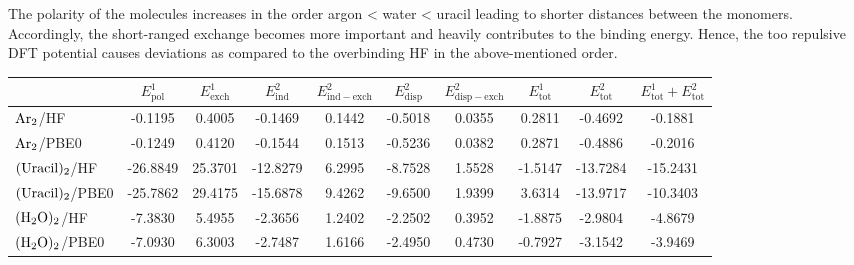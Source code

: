 \documentclass[a4paper,12pt]{scrartcl}
\newcommand{\m}[1]{\mathrm{#1}}
\begin{document}
The polarity of the molecules increases in the order argon < water < uracil leading to shorter distances between the monomers. Accordingly, the short-ranged exchange becomes more important and heavily contributes to the binding energy. Hence, the too repulsive DFT potential causes deviations as compared to the overbinding HF in the above-mentioned order.
%
\begin{table}
	\centering
	\label{tab:noncov}
	\begin{adjustbox}{width=\columnwidth,center}
		\begin{tabular}{l|ccccccccc}
			\toprule
			                        & $ E^1_\m{pol} $ & $ E^1_\m{exch} $ & $ E^2_\m{ind} $ & $ E^2_\m{ind-exch} $ & $ E^2_\m{disp} $ & $ E^2_\m{disp-exch} $ & $ E^1_\m{tot} $ & $ E^2_\m{tot} $ & $ E^1_\m{tot} + E^2_\m{tot} $ \\
			\midrule
			$ \ce{Ar2} $/HF         & -0.1195         & 0.4005           & -0.1469         & 0.1442               & -0.5018          & 0.0355                & 0.2811          & -0.4692         & -0.1881                       \\
			$ \ce{Ar2} $/PBE0       & -0.1249         & 0.4120           & -0.1544         & 0.1513               & -0.5236          & 0.0382                & 0.2871          & -0.4886         & -0.2016                       \\
			$ \ce{(Uracil)2} $/HF   & -26.8849        & 25.3701          & -12.8279        & 6.2995               & -8.7528          & 1.5528                & -1.5147         & -13.7284        & -15.2431                      \\
			$ \ce{(Uracil)2} $/PBE0 & -25.7862        & 29.4175          & -15.6878        & 9.4262               & -9.6500          & 1.9399                & 3.6314          & -13.9717        & -10.3403                      \\
			$ \ce{(H2O)2} $/HF      & -7.3830         & 5.4955           & -2.3656         & 1.2402               & -2.2502          & 0.3952                & -1.8875         & -2.9804         & -4.8679                       \\
			$ \ce{(H2O)2} $/PBE0    & -7.0930         & 6.3003           & -2.7487         & 1.6166               & -2.4950          & 0.4730                & -0.7927         & -3.1542         & -3.9469                       \\
			\bottomrule
		\end{tabular}
	\end{adjustbox}
\end{table}
\end{document}
